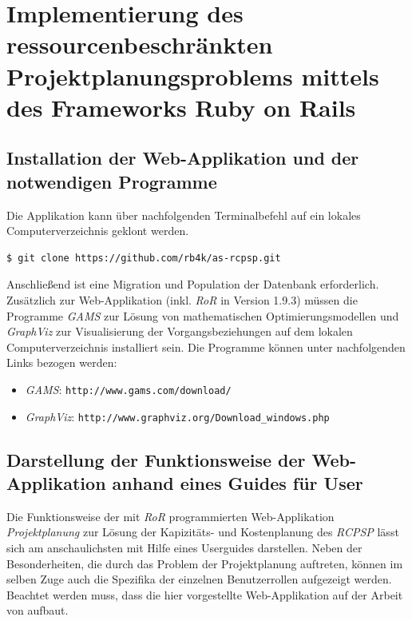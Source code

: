 \documentclass[a4paper,12pt,parskip,bibtotoc,liststotoc]{article}
\begin{document}
\section{Implementierung des ressourcenbeschränkten Projektplanungsproblems mittels des Frameworks Ruby on Rails} \label{Haupt}
\subsection{Installation der Web-Applikation und der notwendigen Programme}
Die Applikation kann über nachfolgenden Terminalbefehl auf ein lokales Computerverzeichnis geklont werden.
\begin{lstlisting}[style=Befehl]
$ git clone https://github.com/rb4k/as-rcpsp.git
\end{lstlisting}
Anschließend ist eine Migration und Population der Datenbank erforderlich. Zusätzlich zur Web-Applikation (inkl. \textit{RoR} in Version 1.9.3) müssen die Programme \textit{GAMS} zur Lösung von mathematischen Optimierungsmodellen und \textit{GraphViz} zur Visualisierung der Vorgangsbeziehungen auf dem lokalen Computerverzeichnis installiert sein. Die Programme können unter nachfolgenden Links bezogen werden:
\begin{itemize}
\item \textit{GAMS}: \texttt{http://www.gams.com/download/}
\item \textit{GraphViz}: \texttt{http://www.graphviz.org/Download\_windows.php}
\end{itemize}

\subsection{Darstellung der Funktionsweise der Web-Applikation anhand eines Guides für User}\label{User}
Die Funktionsweise der mit \textit{RoR} programmierten Web-Applikation \textit{\glqq Projektplanung\grqq} zur Lösung der Kapizitäts- und Kostenplanung des \textit{RCPSP} lässt sich am anschaulichsten mit Hilfe eines Userguides darstellen. 
Neben der Besonderheiten, die durch das Problem der Projektplanung auftreten, können im selben Zuge auch die Spezifika der einzelnen Benutzerrollen aufgezeigt werden. Beachtet werden muss, dass die hier vorgestellte Web-Applikation auf der Arbeit von \cite{hartl2012ruby} aufbaut.\\
\end{document}
